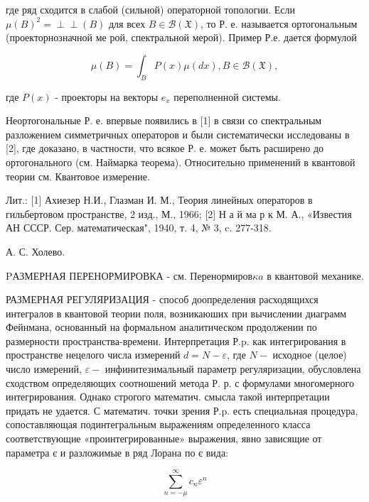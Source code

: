 \documentclass[10pt]{article}
\def\Perp{\perp\!\!\!\perp}
\begin{document}
где ряд сходится в слабой (сильной) операторной топологии. Если $\mu(B)^{2}=\Perp(B)$ для всех $B \in \mathscr{B}(\mathfrak{X})$, то Р. е. называется ортогональным (проекторнозначной ме рой, спектральной мерой). Пример Р.е. дается формулой



\[

\mu(B)=\int_{B} P(x) \mu(d x), B \in \mathscr{B}(\mathfrak{X}),

\]



где $P(x)$ - проекторы на векторы $e_{x}$ переполненной системы.



Неортогональные Р. е. впервые появились в [1] в связи со спектральным разложением симметричных операторов и были систематически исследованы в [2], где доказано, в частности, что всякое Р. е. может быть расширено до ортогонального (см. Наймарка теорема). Относительно применений в квантовой теории см. Квантовое измерение.



Лит.: [1] Ахиезер Н.И., Глазман И. М., Теория линейных операторов в гильбертовом пространстве, 2 изд., М., 1966; [2] Н а й ма р к М. А., «Известия АН СССР. Сер. математическая", 1940, т. 4, № 3, c. 277-318.



А. С. Холево.



PАЗМЕРНАЯ ПЕРЕНОРМИРОВКА - см. Перенормиров$\kappa a$ в квантовой механике.



РАЗМЕРНАЯ РЕГУЛЯРИЗАЦИЯ - способ доопределения расходящихся интегралов в квантовой теории поля, возникаюших при вычислении диаграмм Фейнмана, основанный на формальном аналитическом продолжении по размерности пространства-времени. Интерпретация Р.p. как интегрирования в пространстве нецелого числа измерений $d=N-\varepsilon$, где $N-$ исходное (целое) число измерений, $\varepsilon-$ инфинитезимальный параметр регуляризации, обусловлена сходством определяющих соотношений метода Р. р. с формулами многомерного интегрирования. Однако строгого математич. смысла такой интерпретации придать не удается. С математич. точки зрения Р.p. есть специальная процедура, сопоставляющая подинтегральным выражениям определенного класса соответствующие «проинтегрированные» выражения, явно зависящие от параметра є и разложимые в ряд Лорана по є вида:



\[

\sum_{n=-\mu}^{\infty} c_{n} \varepsilon^{n}

\]
\end{document}
